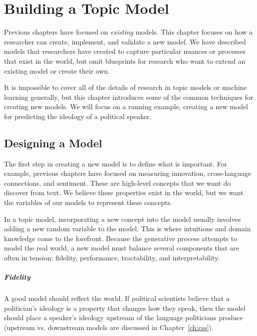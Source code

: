 

\chapter{Building a Topic Model}
\label{ch:building}

Previous chapters have focused on \emph{existing} models.  This
chapter focuses on how a researcher can create, implement, and
validate a new model.  We have described
models that researchers have created to capture particular nuances or
processes that exist in the world, but omit blueprints
for research who want to extend an existing model or create their own.

It is impossible to cover all of the details of research in topic
models or machine learning generally, but this chapter introduces some
of the common techniques for creating new models.  We will focus on a
running example, creating a new model for predicting the
ideology of a political speaker.

\section{Designing a Model}

The first step in creating a new model is to define what is
important.  For example, previous chapters have focused on measuring
innovation, cross-language connections, and sentiment.  These are
high-level concepts that we want do discover from text.  We believe
these properties exist in the world, but we want the variables of our models to represent
these concepts.

In a topic model, incorporating a new concept into the model usually
involves adding a new random variable to the model.  This is where
intuitions and domain knowledge come to the forefront.  Because the
generative process attempts to model the real world, a new model must
balance several components that are often in tension: fidelity,
performance, tractability, and interpretability.

\paragraph{Fidelity}

A good model should reflect the world.  If political scientists
believe that a politician's ideology is a property that changes how they speak, then the model should place a
speaker's ideology upstream of the language politicians produce
(upstream vs. downstream models are discussed in Chapter~\ref{ch:css}).

